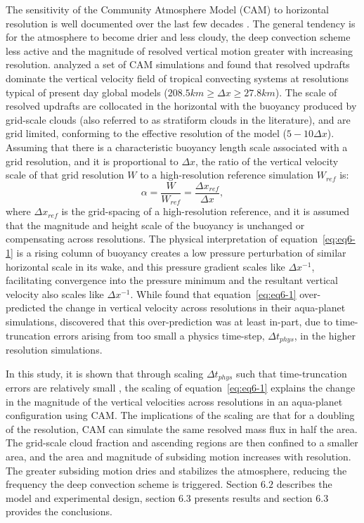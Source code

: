 The sensitivity of the Community Atmosphere Model (CAM) to horizontal resolution is well documented over the last few decades \citep{KW1991JGR,WETAL1995CD,W1999T,W2008TELLUS,LETAL2011TELLUS,RJ2011MWR,RETAL2012ASL,OETAL2013JCLIM,RETAL2013JCLIM,ZetAl2014JCb,LETAL2015JCLIM}. The general tendency is for the atmosphere to become drier and less cloudy, the deep convection scheme less active and the magnitude of resolved vertical motion greater with increasing resolution. \cite{HR2017JCLIM,HR2018JAMES} analyzed a set of CAM simulations and found that resolved updrafts dominate the vertical velocity field of tropical convecting systems at resolutions typical of present day global models ($208.5 km \geq \Delta x \geq 27.8 km$). The scale of resolved updrafts are collocated in the horizontal with the buoyancy produced by grid-scale clouds (also referred to as stratiform clouds in the literature), and are grid limited, conforming to the effective resolution of the model ($5-10\Delta x$). Assuming that there is a characteristic buoyancy length scale associated with a grid resolution, and it is proportional to $\Delta x$, the ratio of the vertical velocity scale of that grid resolution $W$ to a high-resolution reference simulation $W_{ref}$ is:
\begin{equation}
\alpha = \frac{W}{W_{ref}} = \frac{\Delta x_{ref}}{\Delta x} , \label{eq:eq6-1}
\end{equation}
where $\Delta x_{ref}$ is the grid-spacing of a high-resolution reference, and it is assumed that the magnitude and height scale of the buoyancy is unchanged or compensating across resolutions. The physical interpretation of equation~\ref{eq:eq6-1} is a rising column of buoyancy creates a low pressure perturbation of similar horizontal scale in its wake, and this pressure gradient scales like $\Delta x^{-1}$, facilitating convergence into the pressure minimum and the resultant vertical velocity also scales like $\Delta x^{-1}$. While \cite{HR2017JCLIM} found that equation~\ref{eq:eq6-1} over-predicted the change in vertical velocity across resolutions in their aqua-planet simulations, \cite{HR2017JCLIM} discovered that this over-prediction was at least in-part, due to time-truncation errors arising from too small a physics time-step, $\Delta t_{phys}$, in the higher resolution simulations.

In this study, it is shown that through scaling $\Delta t_{phys}$ such that time-truncation errors are relatively small \citep[Appendix A][]{HETAL2019JAMES}, the scaling of equation~\ref{eq:eq6-1} explains the change in the magnitude of the vertical velocities across resolutions in an aqua-planet configuration using CAM. The implications of the scaling are that for a doubling of the resolution, CAM can simulate the same resolved mass flux in half the area. The grid-scale cloud fraction and ascending regions are then confined to a smaller area, and the area and magnitude of subsiding motion increases with resolution. The greater subsiding motion dries and stabilizes the atmosphere, reducing the frequency the deep convection scheme is triggered. Section $6.2$ describes the model and experimental design, section 6.3 presents results and section 6.3 provides the conclusions.

